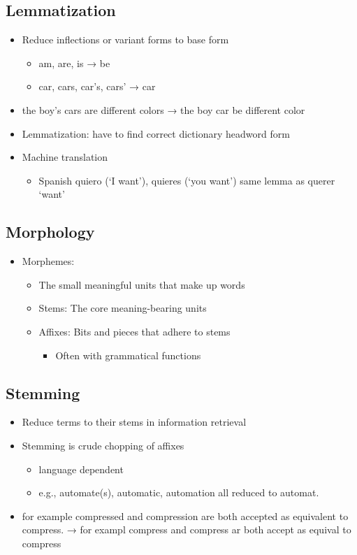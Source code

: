 \documentclass[11pt]{article}
\theoremstyle{definition}
\begin{document}
\subsection{Lemmatization}
\begin{itemize}
  \item Reduce inflections or variant forms to base form
  \begin{itemize}
    \item am, are, is → be
    \item car, cars, car's, cars' → car
  \end{itemize}
  \item the boy's cars are different colors → the boy car be different color
  \item Lemmatization: have to find correct dictionary headword form
  \item Machine translation
  \begin{itemize}
    \item Spanish quiero (‘I want’), quieres (‘you want’) same lemma as querer ‘want’
  \end{itemize}
\end{itemize}

\subsection{Morphology}
\begin{itemize}
  \item Morphemes:
  \begin{itemize}
    \item The small meaningful units that make up words
    \item Stems: The core meaning-bearing units
    \item Affixes: Bits and pieces that adhere to stems
    \begin{itemize}
      \item Often with grammatical functions
    \end{itemize}
  \end{itemize}
\end{itemize}

\subsection{Stemming}
\begin{itemize}
  \item Reduce terms to their stems in information retrieval
  \item Stemming is crude chopping of affixes
  \begin{itemize}
    \item language dependent
    \item e.g., automate(s), automatic, automation all reduced to automat.
  \end{itemize}
  \item for example compressed
  and compression are both
  accepted as equivalent to
  compress. → for exampl compress and
  compress ar both accept
  as equival to compress
\end{itemize}
\end{document}
